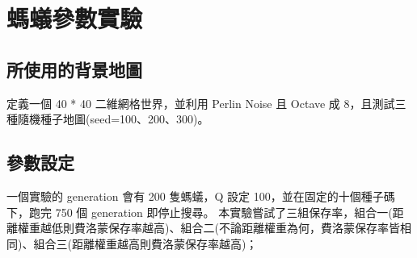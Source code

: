 \documentclass[sigconf]{acmart}
\begin{document}
\vspace{-2mm}
\begin{table}[H]
	\centering	
	\normalsize
    \newcommand{\z}{\phantom{0}}
    \caption{功能表}
    \vspace{-\baselineskip}
	\label{table:feature}
   \vspace{-\baselineskip}
\end{table}




\section{螞蟻參數實驗}
\label{sec:proposed}

\subsection{所使用的背景地圖}

定義一個 40 * 40 二維網格世界，並利用 Perlin Noise 且 Octave 成 8，且測試三種隨機種子地圖(seed=100、200、300)。


\subsection{參數設定}

一個實驗的 generation 會有 200 隻螞蟻，Q 設定 100，並在固定的十個種子碼下，跑完 750 個 generation 即停止搜尋。
 本實驗嘗試了三組保存率，組合一(距離權重越低則費洛蒙保存率越高)、組合二(不論距離權重為何，費洛蒙保存率皆相同)、組合三(距離權重越高則費洛蒙保存率越高)；
\end{document}

